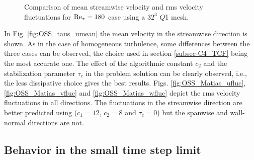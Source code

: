 \begin{figure}[h!]
 	\caption{Comparison of mean streamwise velocity and rms velocity fluctuations for ${\rm Re}_\tau=180$ case using a $32^3$ $Q$1 mesh.}
    \label{fig:OSS_taus_fluc}
\end{figure}

In Fig. \ref{fig:OSS_taus_umean} the mean velocity in the streamwise direction is shown. As in the case of homogeneous turbulence, some differences between the three cases can be observed, the choice used in section \ref{subsec-C4_TCF} being the most accurate one. The effect of the algorithmic constant $c_2$ and the stabilization parameter $\tau_c$ in the problem solution can be clearly observed, i.e., the less dissipative choice gives the best results.
Figs. \ref{fig:OSS_Matias_ufluc}, \ref{fig:OSS_Matias_vfluc} and \ref{fig:OSS_Matias_wfluc} depict the rms velocity fluctuations in all directions. The fluctuations in the streamwise direction are better predicted using ($c_1=12$, $c_2=8$ and $\tau_c=0$) but the spanwise and wall-normal directions are not.

\subsection{Behavior in the small time step limit}
\label{subsec-C4_small_time_step}

